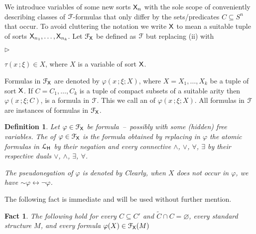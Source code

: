 \documentclass{amsproc}
\newcommand{\mylabel}[1]{{#1}\hfill}
\renewenvironment{itemize}
  {\begin{list}{$\triangleright$}{%
  \setlength{\parskip}{0mm}
  \setlength{\topsep}{.1\baselineskip}
  \setlength{\rightmargin}{0mm}
  \setlength{\listparindent}{0mm}
  \setlength{\itemindent}{0mm}
  \setlength{\labelwidth}{3ex}
  \setlength{\itemsep}{.1\baselineskip}
  \setlength{\parsep}{.1\baselineskip}
  \setlength{\partopsep}{0mm}
  \setlength{\labelsep}{1ex}
  \setlength{\leftmargin}{\labelwidth+\labelsep}
  \let\makelabel\mylabel}}{%
\end{list}}
\newcounter{thm}
\theoremstyle{mio}
\newtheorem{fact}[thm]{Fact}\tcolorboxenvironment{fact}{mythm}
\newtheorem{definition}[thm]{Definition}\tcolorboxenvironment{definition}{mythm}
\renewcommand*{\emph}[1]{%
   \smash{\tikz[baseline]\node[rectangle, fill=teal!25, rounded corners, inner xsep=0.5ex, inner ysep=0.2ex, anchor=base, minimum height = 2.7ex]{\strut #1};}}
\begin{document}
We introduce variables of some new sorts ${\sf X}_n$ with the sole scope of conveniently describing classes of ${\EuScript F}$-formulas that only differ by the sets/predicates $C\subseteq S^n$ that occur.
To avoid cluttering the notation we write ${\sf X}$ to mean a suitable tuple of sorts ${\sf X}_{n_1},\dots,{\sf X}_{n_k}$.
Let ${\EuScript F}_{\sf X}$ be defined as ${\EuScript F}$ but replacing (ii) with\smallskip

\begin{itemize}
  \item[iii.] $\tau(x\,;\xi)\in X$, where $X$ is a variable of sort ${\sf X}$.
\end{itemize}

Formulas in ${\EuScript F}_{\sf X}$ are denoted by $\varphi(x\,;\xi;X)$, where $X=X_1,\dots,X_k$ be a tuple of sort ${\sf X}$.
If $C=C _1,\dots,C_k$ is a tuple of compact subsets of a suitable arity then $\varphi(x\,;\xi;C)$, is a formula in ${\EuScript F}$.
This we call an \emph{instance\/} of $\varphi(x\,;\xi;X)$.
All formulas in ${\EuScript F}$ are instances of formulas in ${\EuScript F}_{\sf X}$.

\begin{definition}
   Let $\varphi\in{\EuScript F}_{\sf X}$ be formula~--~possibly with some (hidden) free variables.
   The \emph{pseudonegation\/} of $\varphi\in{\EuScript F}_{\sf X}$ is the formula obtained by replacing in $\varphi$ the atomic formulas in  ${\EuScript L}_{\sf H}$ by their negation and every connective $\wedge$, $\vee$, $\forall$, $\exists$
   by their respective duals $\vee$, $\wedge$, $\exists$, $\forall$.
   
  The pseudonegation of $\varphi$ is denoted by \emph{${\sim}\varphi$.}
  Clearly, when $X$ does not occur in $\varphi$, we have ${\sim}\varphi\leftrightarrow\neg\varphi$.
\end{definition}


The following fact is immediate and will be used without further mention.

\begin{fact}\label{fact_trivial}
  The following hold for every $C\subseteq C'$ and $\tilde C\cap C=\varnothing$, every standard structure $M$, and every formula $\varphi(X)\in{\EuScript F}_{\sf X}(M)$

  \smallskip

  \smallskip
  
\end{fact}
\end{document}
